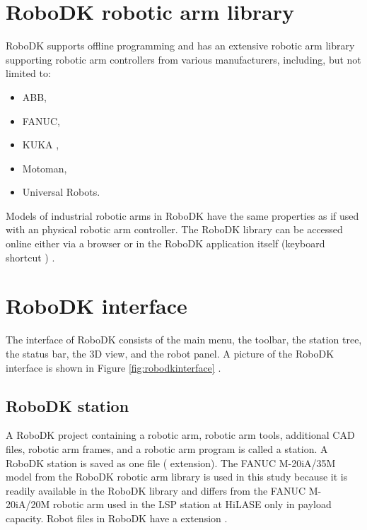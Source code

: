 \section{RoboDK robotic arm library}

RoboDK supports offline programming and has an extensive robotic arm library supporting robotic arm controllers from various manufacturers, including, but not limited to:

\begin{itemize}
    \item ABB, 
    \item FANUC, 
    \item KUKA ,
    \item Motoman, 
    \item Universal Robots.
\end{itemize}
Models of industrial robotic arms in RoboDK have the same properties as if used with an physical robotic arm controller. The RoboDK library can be accessed online either via a browser or in the RoboDK application itself (keyboard shortcut ) \cite{robodklibrary}.


\section{RoboDK interface}

The interface of RoboDK consists of the main menu, the toolbar, the station tree, the status bar, the 3D view, and the robot panel. A picture of the RoboDK interface is shown in Figure \ref{fig:robodkinterface} \cite{robodkinterface}.

\subsection{RoboDK station}

A RoboDK project containing a robotic arm, robotic arm tools, additional CAD files, robotic arm frames, and a robotic arm program is called a station. A RoboDK station is saved as one file ( extension).  The FANUC M-20iA/35M model from the RoboDK robotic arm library is used in this study because it is readily available in the RoboDK library and differs from the FANUC M-20iA/20M robotic arm used in the LSP station at HiLASE only in payload capacity. Robot files in RoboDK have a  extension \cite{robodkstation}.

